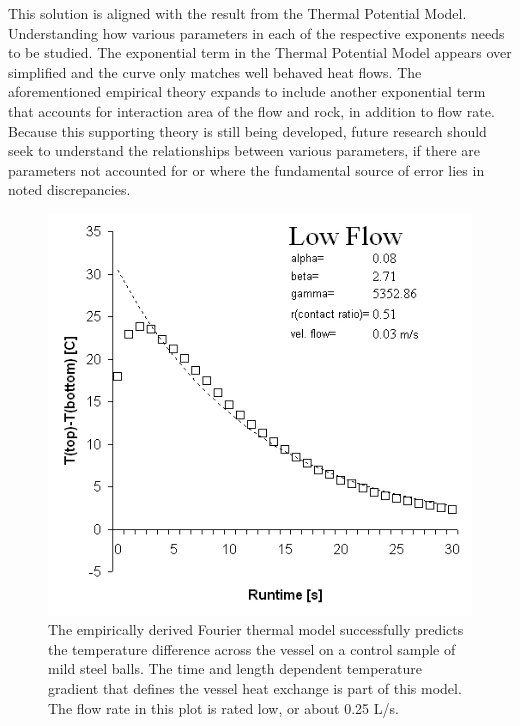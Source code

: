 This solution is aligned with the result from the Thermal Potential Model. Understanding how various parameters in each of the respective exponents needs to be studied. The exponential term in the Thermal Potential Model appears over simplified and the curve only matches well behaved heat flows. The aforementioned empirical theory expands to include another exponential term that accounts for interaction area of the flow and rock, in addition to flow rate. Because this supporting theory is still being developed, future research should seek to understand the relationships between various parameters, if there are parameters not accounted for or where the fundamental source of error lies in noted discrepancies. 

\begin{figure}
\label{rctherm}
\begin{center}
\includegraphics[scale=.25]{steellowFlow.jpg}
\caption{The empirically derived Fourier thermal model successfully predicts the temperature difference across the vessel on a control sample of mild steel balls. The time and length dependent temperature gradient that defines the vessel heat exchange is part of this model. The flow rate in this plot is rated low, or about 0.25 L/s.}
\end{center}
\end{figure}




 



